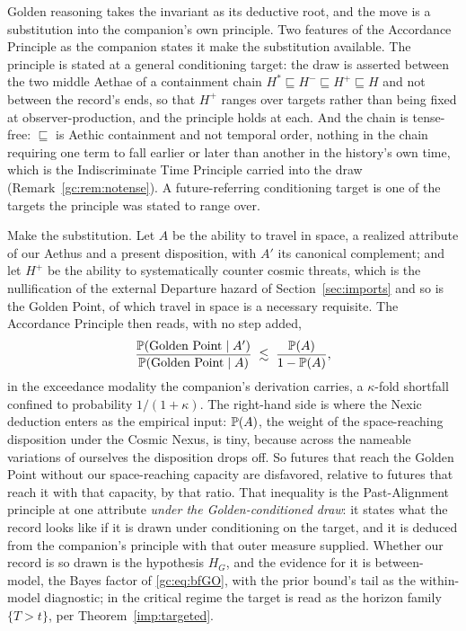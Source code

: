 Golden reasoning takes the invariant as its deductive root, and the
move is a substitution into the companion's own principle. Two
features of the Accordance Principle as the companion states it make
the substitution available. The principle is stated at a general
conditioning target: the draw is asserted between the two middle
Aethae of a containment chain
$H^{\ast}\sqsubseteq H^{-}\sqsubseteq H^{+}\sqsubseteq H$ and not
between the record's ends, so that $H^{+}$ ranges over targets rather
than being fixed at observer-production, and the principle holds at
each. And the chain is tense-free: $\sqsubseteq$ is Aethic
containment and not temporal order, nothing in the chain requiring one
term to fall earlier or later than another in the history's own time,
which is the Indiscriminate Time Principle carried into the draw
(Remark~\ref{gc:rem:notense}). A future-referring conditioning target
is one of the targets the principle was stated to range over.

Make the substitution. Let $A$ be the ability to travel in space, a
realized attribute of our Aethus and a present disposition, with $A'$
its canonical complement; and let $H^{+}$ be the ability to
systematically counter cosmic threats, which is the nullification of
the external Departure hazard of Section~\ref{sec:imports} and so is the Golden
Point, of which travel in space is a necessary requisite. The
Accordance Principle then reads, with no step added,
\begin{equation}\label{gc:eq:pinnacle}
\frac{\mathbb{P}(\text{Golden Point}\mid A')}{\mathbb{P}(\text{Golden Point}\mid A)}
\;\lesssim\;\frac{\mathbb{P}(A)}{1-\mathbb{P}(A)},
\end{equation}
in the exceedance modality the companion's derivation carries, a
$\kappa$-fold shortfall confined to probability $1/(1+\kappa)$. The
right-hand side is where the Nexic deduction enters as the empirical
input: $\mathbb{P}(A)$, the weight of the space-reaching disposition under
the Cosmic Nexus, is tiny, because across the nameable variations of
ourselves the disposition drops off. So futures that reach the Golden
Point without our space-reaching capacity are disfavored, relative to
futures that reach it with that capacity, by that ratio. That
inequality is the Past-Alignment principle at one attribute
\emph{under the Golden-conditioned draw}: it states what the record
looks like if it is drawn under conditioning on the target, and it is
deduced from the companion's principle with that outer measure
supplied. Whether our record is so drawn is the hypothesis $H_G$, and
the evidence for it is between-model, the Bayes factor of
\eqref{gc:eq:bfGO}, with the prior bound's tail as the within-model
diagnostic; in the critical regime the target is read as the horizon
family $\{T>t\}$, per Theorem~\ref{imp:targeted}.

